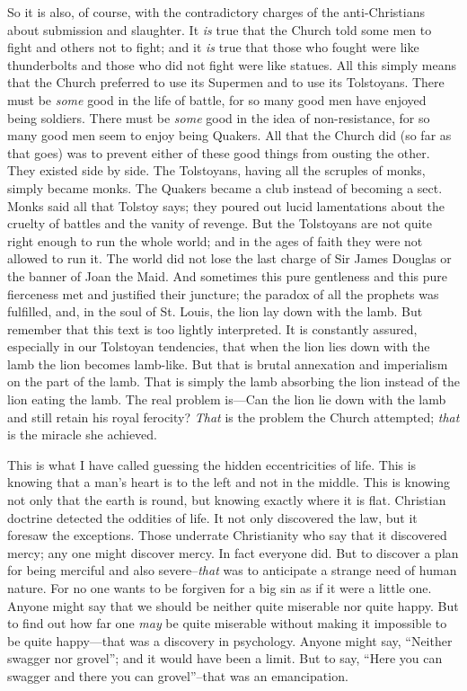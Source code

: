 \documentclass{book}
\begin{document}
So it is also, of course, with the contradictory charges of the anti-Christians about submission and slaughter. It \emph{is} true that the Church told some men to fight and others not to fight; and it \emph{is} true that those who fought were like thunderbolts and those who did not fight were like statues. All this simply means that the Church preferred to use its Supermen and to use its Tolstoyans. There must be \emph{some} good in the life of battle, for so many good men have enjoyed being soldiers. There must be \emph{some} good in the idea of non-resistance, for so many good men seem to enjoy being Quakers. All that the Church did (so far as that goes) was to prevent either of these good things from ousting the other. They existed side by side. The Tolstoyans, having all the scruples of monks, simply became monks. The Quakers became a club instead of becoming a sect. Monks said all that Tolstoy says; they poured out lucid lamentations about the cruelty of battles and the vanity of revenge. But the Tolstoyans are not quite right enough to run the whole world; and in the ages of faith they were not allowed to run it. The world did not lose the last charge of Sir James Douglas or the banner of Joan the Maid. And sometimes this pure gentleness and this pure fierceness met and justified their juncture; the paradox of all the prophets was fulfilled, and, in the soul of St. Louis, the lion lay down with the lamb. But remember that this text is too lightly interpreted. It is constantly assured, especially in our Tolstoyan tendencies, that when the lion lies down with the lamb the lion becomes lamb-like. But that is brutal annexation and imperialism on the part of the lamb. That is simply the lamb absorbing the lion instead of the lion eating the lamb. The real problem is—Can the lion lie down with the lamb and still retain his royal ferocity? \emph{That} is the problem the Church attempted; \emph{that} is the miracle she achieved.

This is what I have called guessing the hidden eccentricities of life. This is knowing that a man’s heart is to the left and not in the middle. This is knowing not only that the earth is round, but knowing exactly where it is flat. Christian doctrine detected the oddities of life. It not only discovered the law, but it foresaw the exceptions. Those underrate Christianity who say that it discovered mercy; any one might discover mercy. In fact everyone did. But to discover a plan for being merciful and also severe–\emph{that} was to anticipate a strange need of human nature. For no one wants to be forgiven for a big sin as if it were a little one. Anyone might say that we should be neither quite miserable nor quite happy. But to find out how far one \emph{may} be quite miserable without making it impossible to be quite happy—that was a discovery in psychology. Anyone might say, “Neither swagger nor grovel”; and it would have been a limit. But to say, “Here you can swagger and there you can grovel”–that was an emancipation.
\end{document}
